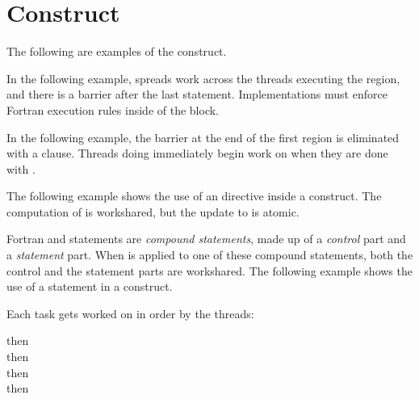 \pagebreak
\section{ Construct}
\fortranspecificstart
\label{sec:workshare}

The following are examples of the  construct. 

In the following example,  spreads work across the threads executing 
the  region, and there is a barrier after the last statement. 
Implementations must enforce Fortran execution rules inside of the  
block.


In the following example, the barrier at the end of the first  
region is eliminated with a  clause. Threads doing  immediately begin work on  when they are done with .

\begin{figure}[t!]
\end{figure}

The following example shows the use of an  directive inside a  
construct. The computation of  is workshared, but the update to 
 is atomic.


Fortran  and  statements are \emph{compound statements}, 
made up of a \emph{control} part and a \emph{statement} part. When  
is applied to one of these compound statements, both the control and the statement 
parts are workshared. The following example shows the use of a  statement 
in a  construct.

Each task gets worked on in order by the threads:

 then
\\
 then
\\
 then
\\
 then
\\

\begin{figure}[t!]
\end{figure}

